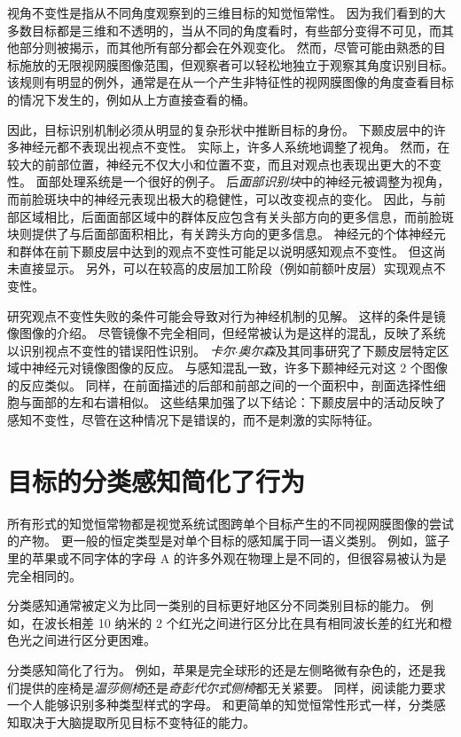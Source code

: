 视角不变性是指从不同角度观察到的三维目标的知觉恒常性。
因为我们看到的大多数目标都是三维和不透明的，当从不同的角度看时，有些部分变得不可见，而其他部分则被揭示，而其他所有部分都会在外观变化。
然而，尽管可能由熟悉的目标施放的无限视网膜图像范围，但观察者可以轻松地独立于观察其角度识别目标。
该规则有明显的例外，通常是在从一个产生非特征性的视网膜图像的角度查看目标的情况下发生的，例如从上方直接查看的桶。


因此，目标识别机制必须从明显的复杂形状中推断目标的身份。
下颞皮层中的许多神经元都不表现出视点不变性。
实际上，许多人系统地调整了视角。
然而，在较大的前部位置，神经元不仅大小和位置不变，而且对观点也表现出更大的不变性。
面部处理系统是一个很好的例子。
后\textit{面部识别块}中的神经元被调整为视角，而前脸斑块中的神经元表现出极大的稳健性，可以改变视点的变化。
因此，与前部区域相比，后面面部区域中的群体反应包含有关头部方向的更多信息，而前脸斑块则提供了与后面部面积相比，有关跨头方向的更多信息。
神经元的个体神经元和群体在前下颞皮层中达到的观点不变性可能足以说明感知观点不变性。
但这尚未直接显示。
另外，可以在较高的皮层加工阶段（例如前额叶皮层）实现观点不变性。


研究观点不变性失败的条件可能会导致对行为神经机制的见解。
这样的条件是镜像图像的介绍。
尽管镜像不完全相同，但经常被认为是这样的混乱，反映了系统以识别视点不变性的错误阳性识别。
\textit{卡尔$\cdot$奥尔森}及其同事研究了下颞皮层特定区域中神经元对镜像图像的反应。
与感知混乱一致，许多下颞神经元对这 2 个图像的反应类似。
同样，在前面描述的后部和前部之间的一个面积中，剖面选择性细胞与面部的左和右谱相似。
这些结果加强了以下结论：下颞皮层中的活动反映了感知不变性，尽管在这种情况下是错误的，而不是刺激的实际特征。



\section{目标的分类感知简化了行为}

所有形式的知觉恒常物都是视觉系统试图跨单个目标产生的不同视网膜图像的尝试的产物。
更一般的恒定类型是对单个目标的感知属于同一语义类别。
例如，篮子里的苹果或不同字体的字母 A 的许多外观在物理上是不同的，但很容易被认为是完全相同的。


分类感知通常被定义为比同一类别的目标更好地区分不同类别目标的能力。
例如，在波长相差 10 纳米的 2 个红光之间进行区分比在具有相同波长差的红光和橙色光之间进行区分更困难。


分类感知简化了行为。
例如，苹果是完全球形的还是左侧略微有杂色的，还是我们提供的座椅是\textit{温莎侧椅}还是\textit{奇彭代尔式侧椅}都无关紧要。
同样，阅读能力要求一个人能够识别多种类型样式的字母。
和更简单的知觉恒常性形式一样，分类感知取决于大脑提取所见目标不变特征的能力。


